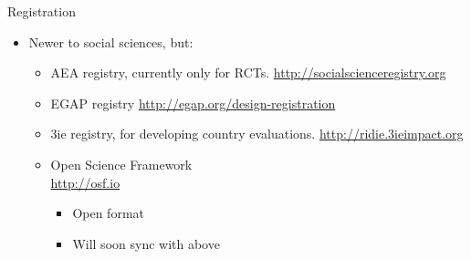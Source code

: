 \documentclass{beamer}
\begin{document}
\begin{frame}{Registration}
\begin{itemize}
   \item Newer to social sciences, but:
   \begin{itemize}[<.->]
   \item
   	AEA registry, currently only for RCTs. \url{http://socialscienceregistry.org}
   \item
    EGAP registry \url{http://egap.org/design-registration}
   \item 
    3ie registry, for developing country evaluations. \url{http://ridie.3ieimpact.org}
   \item
   	Open Science Framework\\ \url{http://osf.io}
   	\begin{itemize}
   	\item
   	Open format
   	\item
   	Will soon sync with above
   	\end{itemize}
   \end{itemize}
  \end{itemize}  
\end{frame}

 { %
    \begin{frame}[plain, label=AEAreg]
     \end{frame}
}
\end{document}
